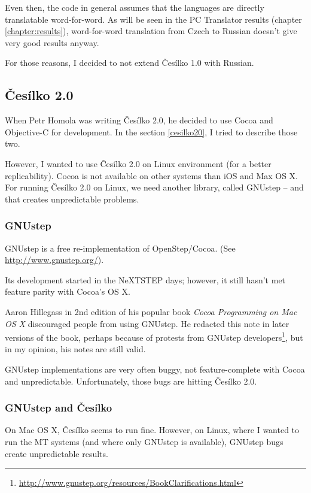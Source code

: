 Even then, the code in general assumes that the languages are directly translatable word-for-word. As will be seen in the PC Translator results (chapter \ref{chapter:results}), word-for-word translation from Czech to Russian doesn't give very good results anyway.

For those reasons, I decided to not extend Česílko 1.0 with Russian.

\subsection{Česílko 2.0}

When Petr Homola was writing Česílko 2.0, he decided to use Cocoa and Objective-C for development. In the section \ref{cesilko20}, I tried to describe those two.

However, I wanted to use Česílko 2.0 on Linux environment (for a better replicability). Cocoa is not available on other systems than iOS and Max OS X. For running Česílko 2.0 on Linux, we need another library, called GNUstep -- and that creates unpredictable problems.

\subsubsection{GNUstep}
GNUstep is a free re-implementation of OpenStep/Cocoa. (See \url{http://www.gnustep.org/}).

Its development started in the NeXTSTEP days; however, it still hasn't met feature parity with Cocoa's OS X.

Aaron Hillegass in 2nd edition of his popular book \emph{Cocoa Programming on Mac OS X} discouraged people from using GNUstep. He redacted this note in later versions of the book, perhaps because of protests from GNUstep developers\footnote{\url{http://www.gnustep.org/resources/BookClarifications.html}}, but in my opinion, his notes are still valid.

GNUstep implementations are very often buggy, not feature-complete with Cocoa and unpredictable. Unfortunately, those bugs are hitting Česílko 2.0.

\subsubsection{GNUstep and Česílko}

On Mac OS X, Česílko seems to run fine.
However, on Linux, where I wanted to run the MT systems (and where only GNUstep is available), GNUstep bugs create unpredictable results.


